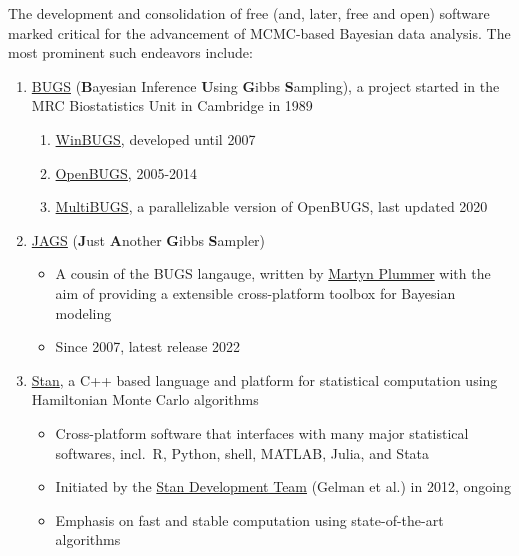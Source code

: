 \documentclass[
  11pt,
]{article}
\providecommand{\tightlist}{%
  \setlength{\itemsep}{0pt}\setlength{\parskip}{0pt}}
\begin{document}
The development and consolidation of free (and, later, free and open) software marked critical for the advancement of MCMC-based Bayesian data analysis. The most prominent such endeavors include:

\begin{enumerate}
\def\labelenumi{\arabic{enumi}.}
\tightlist
\item
  \href{https://www.mrc-bsu.cam.ac.uk/software/bugs/}{BUGS} (\textbf{B}ayesian Inference \textbf{U}sing \textbf{G}ibbs \textbf{S}ampling), a project started in the MRC Biostatistics Unit in Cambridge in 1989

  \begin{enumerate}
  \def\labelenumii{\arabic{enumii}.}
  \tightlist
  \item
    \href{https://www.mrc-bsu.cam.ac.uk/software/bugs/the-bugs-project-winbugs/}{WinBUGS}, developed until 2007
  \item
    \href{https://www.mrc-bsu.cam.ac.uk/software/bugs/openbugs/}{OpenBUGS}, 2005-2014
  \item
    \href{https://www.multibugs.org/}{MultiBUGS}, a parallelizable version of OpenBUGS, last updated 2020
  \end{enumerate}
\item
  \href{https://mcmc-jags.sourceforge.io/}{JAGS} (\textbf{J}ust \textbf{A}nother \textbf{G}ibbs \textbf{S}ampler)

  \begin{itemize}
  \tightlist
  \item
    A cousin of the BUGS langauge, written by \href{https://warwick.ac.uk/fac/sci/statistics/staff/academic-research/plummer/}{Martyn Plummer} with the aim of providing a extensible cross-platform toolbox for Bayesian modeling
  \item
    Since 2007, latest release 2022
  \end{itemize}
\item
  \href{https://mc-stan.org/}{Stan}, a C++ based language and platform for statistical computation using Hamiltonian Monte Carlo algorithms

  \begin{itemize}
  \tightlist
  \item
    Cross-platform software that interfaces with many major statistical softwares, incl.~R, Python, shell, MATLAB, Julia, and Stata
  \item
    Initiated by the \href{https://mc-stan.org/about/team/}{Stan Development Team} (Gelman et al.) in 2012, ongoing
  \item
    Emphasis on fast and stable computation using state-of-the-art algorithms
  \end{itemize}
\end{enumerate}
\end{document}
